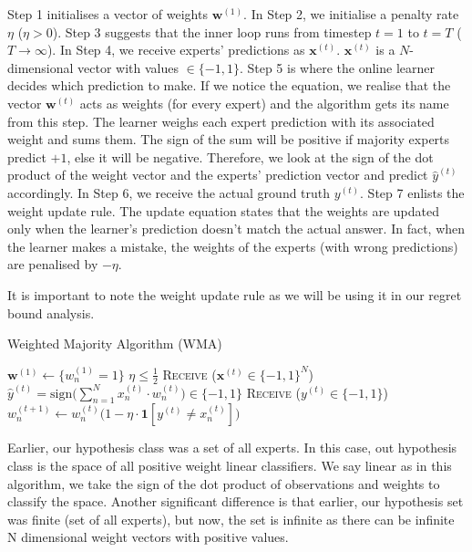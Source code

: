 \documentclass[11pt]{article}
\begin{document}
Step 1 initialises a vector of weights $\textbf{w}^{(1)}$. In Step 2, we initialise a penalty rate $\eta$ ($\eta > 0$). Step 3 suggests that the inner loop runs from timestep $t=1$ to $t=T$ ($T \rightarrow \infty$).
In Step 4, we receive experts' predictions as $\textbf{x}^{(t)}$. $\textbf{x}^{(t)}$ is a $N$-dimensional vector with values $\in\{-1, 1\}$. Step 5 is where the online learner decides which prediction to make. If we notice the equation, we realise that the vector $\textbf{w}^{(t)}$ acts as weights (for every expert) and the algorithm gets its name from this step. The learner weighs each expert prediction with its associated weight and sums them. The sign of the sum will be positive if majority experts predict $+1$, else it will be negative. Therefore, we look at the sign of the dot product of the weight vector and the experts' prediction vector and predict $\hat{y}^{(t)}$ accordingly. In Step 6, we receive the actual ground truth ${y}^{(t)}$. Step 7 enlists the weight update rule. The update equation states that the weights are updated only when the learner's prediction doesn't match the actual answer. In fact, when the learner makes a mistake, the weights of the experts (with wrong predictions) are penalised by $- \eta$. 


It is important to note the weight update rule as we will be using it in our regret bound analysis.

\begin{algorithm}[H]
\caption{Weighted Majority Algorithm (WMA)}
\label{algo:wma}
\begin{algorithmic}[1]
\STATE $\textbf{w}^{(1)} \leftarrow \{w_n^{(1)}=1\}$ \hfill 
\STATE $\eta\leq\frac{1}{2}$\hfill 
{}
\STATE \textsc{Receive} ($\textbf{x}^{(t)}\in\{-1, 1\}^N$) \hfill
\STATE $\hat{y}^{(t)} = \text{sign}\Big(\sum_{n=1}^Nx_n^{(t)}\cdot w_n^{(t)}\Big)\in\{-1, 1\}$ \hfill
\STATE \textsc{Receive} ($y^{(t)}\in\{-1, 1\}$) \hfill 
\STATE $w_n^{(t+1)}\leftarrow w_n^{(t)}\big(1-\eta\cdot\textbf{1}[y^{(t)}\neq x_n^{(t)}]\big)$ \hfill 
\ENDFOR
\end{algorithmic}
\end{algorithm}

Earlier, our hypothesis class was a set of all experts. In this case, out hypothesis class is the space of all positive weight linear classifiers. We say linear as in this algorithm, we take the sign of the dot product of observations and weights to classify the space. Another significant difference is that earlier, our hypothesis set was finite (set of all experts), but now, the set is infinite as there can be infinite N dimensional weight vectors with positive values. 
\end{document}
